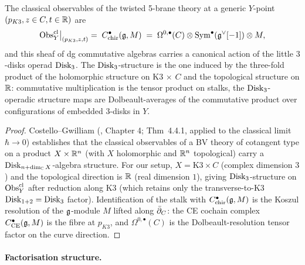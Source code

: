 \begin{proposition}
\label{prop:disk3-action-classical-observables}
The classical observables of the twisted 5-brane theory at a
generic $Y$-point $(p_{K3}, z\in C, t\in\mathbb R)$ are
\begin{equation}
\label{eq:costello-Obs-cl-stalk}
\operatorname{Obs}^{\mathrm{cl}}_Y\bigl|_{(p_{K3},z,t)}
\;=\;
C^\bullet_{\mathrm{chir}}(\mathfrak g, M)
\;=\;
\Omega^{0,\bullet}(C)\otimes \operatorname{Sym}^\bullet(\mathfrak g^\vee[-1])\otimes M,
\end{equation}
and this sheaf of dg commutative algebras carries a canonical action
of the little $3$-disks operad $\mathrm{Disk}_3$. The $\mathrm{Disk}_3$-structure is
the one induced by the three-fold product of the holomorphic structure
on K3 $\times$ $C$ and the topological structure on $\mathbb R$: commutative
multiplication is the tensor product on stalks, the
$\mathrm{Disk}_3$-operadic structure maps are Dolbeault-averages of the
commutative product over configurations of embedded $3$-disks in $Y$.
\end{proposition}

\begin{proof}[Proof]
Costello--Gwilliam (\cite{CG17}, Chapter 4; Thm~4.4.1, applied to the
classical limit $\hbar\to 0$) establishes that the classical
observables of a BV theory of cotangent type on a product
$X\times\mathbb R^n$ (with $X$ holomorphic and $\mathbb R^n$ topological) carry a
$\mathrm{Disk}_{n+\dim_{\mathbb C}X}$-algebra structure. For our setup, $X =
\mathrm{K3}\times C$ (complex dimension $3$) and the topological
direction is $\mathbb R$ (real dimension $1$), giving
$\mathrm{Disk}_{3}$-structure on $\operatorname{Obs}^{\mathrm{cl}}_Y$ after reduction along
K3 (which retains only the transverse-to-K3 $\mathrm{Disk}_{1+2}=\mathrm{Disk}_3$
factor). Identification of the stalk with $C^\bullet_{\mathrm{chir}}(\mathfrak g,
M)$ is the Koszul resolution of the $\mathfrak g$-module $M$ lifted along
$\bar\partial_C$: the CE cochain complex $C^\bullet_{\mathrm{CE}}(\mathfrak g,M)$ is
the fibre at $p_{K3}$, and $\Omega^{0,\bullet}(C)$ is the
Dolbeault-resolution tensor factor on the curve direction.
\end{proof}

\paragraph{Factorisation structure.}

